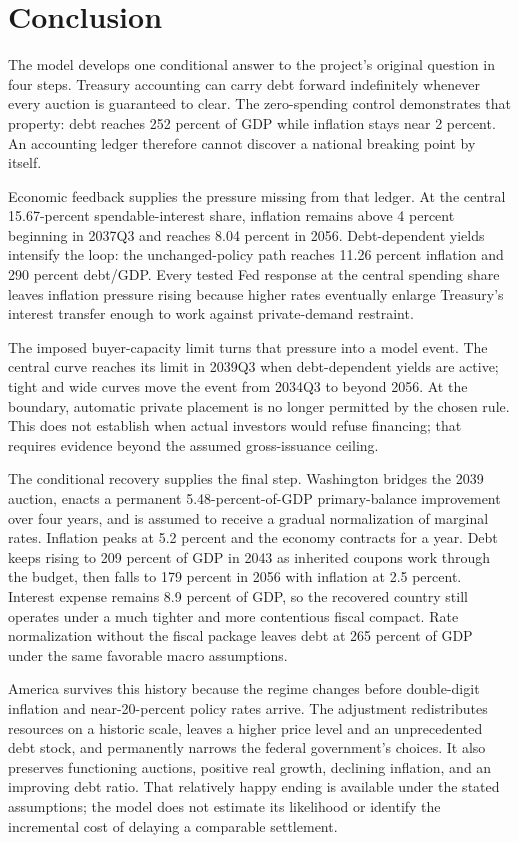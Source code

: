 \documentclass[11pt]{article}
\begin{document}
\section{Conclusion}

The model develops one conditional answer to the project's original question in four steps.  Treasury accounting can
carry debt forward indefinitely whenever every auction is guaranteed to clear.  The
zero-spending control demonstrates that property: debt reaches 252 percent of GDP while
inflation stays near 2 percent.  An accounting ledger therefore cannot discover a national
breaking point by itself.

Economic feedback supplies the pressure missing from that ledger.  At the central
15.67-percent spendable-interest share, inflation remains above 4 percent beginning in
2037Q3 and reaches 8.04 percent in 2056.  Debt-dependent yields intensify the loop: the
unchanged-policy path reaches 11.26 percent inflation and 290 percent debt/GDP.  Every tested
Fed response at the central spending share leaves inflation pressure rising because higher
rates eventually enlarge Treasury's interest transfer enough to work against private-demand
restraint.

The imposed buyer-capacity limit turns that pressure into a model event. The central
curve reaches its limit in 2039Q3 when debt-dependent yields are active; tight and wide
curves move the event from 2034Q3 to beyond 2056. At the boundary, automatic private
placement is no longer permitted by the chosen rule. This does not establish when
actual investors would refuse financing; that requires evidence beyond the assumed
gross-issuance ceiling.

The conditional recovery supplies the final step.  Washington bridges the 2039 auction,
enacts a permanent 5.48-percent-of-GDP primary-balance improvement over four years, and
is assumed to receive a gradual normalization of marginal rates.  Inflation peaks at 5.2 percent and the economy
contracts for a year.  Debt keeps rising to 209 percent of GDP in 2043 as inherited coupons
work through the budget, then falls to 179 percent in 2056 with inflation at 2.5 percent.
Interest expense remains 8.9 percent of GDP, so the recovered country still operates under a
much tighter and more contentious fiscal compact.  Rate normalization without the fiscal
package leaves debt at 265 percent of GDP under the same favorable macro assumptions.

America survives this history because the regime changes before double-digit inflation and
near-20-percent policy rates arrive.  The adjustment redistributes resources on a historic
scale, leaves a higher price level and an unprecedented debt stock, and permanently narrows
the federal government's choices.  It also preserves functioning auctions, positive real
growth, declining inflation, and an improving debt ratio.  That relatively happy ending is
available under the stated assumptions; the model does not estimate its likelihood
or identify the incremental cost of delaying a comparable settlement.
\end{document}
